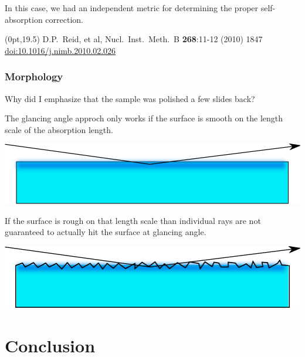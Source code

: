 \documentclass[10pt, xcolor=x11names, compress]{beamer}
\begin{document}
\begin{frame}
  \medskip

  \begin{exampleblock}{}
    In this case, we had an independent metric for determining the
    proper self-absorption correction.
  \end{exampleblock}
  \begin{textblock*}{0.5\linewidth}(0pt,19.5\TPVertModule)
    \tiny%
    D.P.~Reid, et al, Nucl.\ Inst.\ Meth.\ B \textbf{268}:11-12 (2010)
    1847
    \href{http://dx.doi.org10.1016/j.nimb.2010.02.026}
    {\color{Blue2}doi:10.1016/j.nimb.2010.02.026}
  \end{textblock*}
\end{frame}

\begin{frame}
  \frametitle{Morphology}
  \begin{exampleblock}{}
    Why did I emphasize that the sample was polished a few slides back?
  \end{exampleblock}

  The glancing angle approch only works if the surface is smooth on
  the length scale of the absorption length.
  \begin{center}
    \includegraphics[width=0.8\linewidth]{images/smooth.pdf}
  \end{center}

  If the surface is rough on that length scale than individual rays
  are not guaranteed to actually hit the surface at glancing angle.
  \begin{center}
    \includegraphics[width=0.8\linewidth]{images/rough.pdf}
  \end{center}


\end{frame}

\section{Conclusion}
\end{document}
